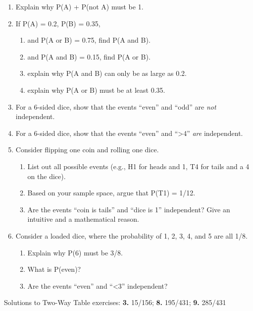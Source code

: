 \documentclass[
  letterpaper,
  DIV=11,
  numbers=noendperiod,
  oneside]{scrreprt}
\providecommand{\tightlist}{%
  \setlength{\itemsep}{0pt}\setlength{\parskip}{0pt}}\usepackage{longtable,booktabs,array}
\begin{document}
\begin{enumerate}
\def\labelenumi{\arabic{enumi}.}
\tightlist
\item
  Explain why P(A) + P(not A) must be 1.
\item
  If P(A) = 0.2, P(B) = 0.35,

  \begin{enumerate}
  \def\labelenumii{\alph{enumii}.}
  \tightlist
  \item
    and P(A or B) = 0.75, find P(A and B).
  \item
    and P(A and B) = 0.15, find P(A or B).
  \item
    explain why P(A and B) can only be as large as 0.2.
  \item
    explain why P(A or B) must be at least 0.35.
  \end{enumerate}
\item
  For a 6-sided dice, show that the events ``even'' and ``odd'' are
  \emph{not} independent.
\item
  For a 6-sided dice, show that the events ``even'' and
  ``\textgreater4'' \emph{are} independent.
\item
  Consider flipping one coin and rolling one dice.

  \begin{enumerate}
  \def\labelenumii{\alph{enumii}.}
  \tightlist
  \item
    List out all possible events (e.g., H1 for heads and 1, T4 for tails
    and a 4 on the dice).
  \item
    Based on your sample space, argue that P(T1) = 1/12.
  \item
    Are the events ``coin is tails'' and ``dice is 1'' independent? Give
    an intuitive and a mathematical reason.
  \end{enumerate}
\item
  Consider a loaded dice, where the probability of 1, 2, 3, 4, and 5 are
  all 1/8.

  \begin{enumerate}
  \def\labelenumii{\alph{enumii}.}
  \tightlist
  \item
    Explain why P(6) must be 3/8.
  \item
    What is P(even)?
  \item
    Are the events ``even'' and ``\textless3'' independent?
  \end{enumerate}
\end{enumerate}

Solutions to Two-Way Table exercises: \textbf{3.} 15/156; \textbf{8.}
195/431; \textbf{9.} 285/431
\end{document}
